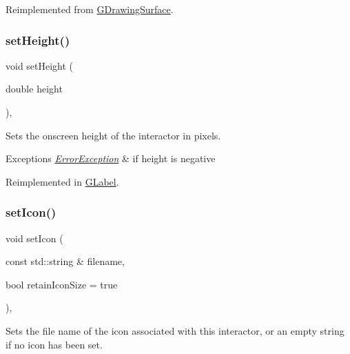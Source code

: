 Reimplemented from \mbox{\hyperlink{classGDrawingSurface_af59209aeadea6dfc6d97a2d8531f50e1}{G\+Drawing\+Surface}}.

\mbox{\label{classGInteractor_a9e280bfc4544dfaf8e4376c4e1a74357}} 
\subsubsection{\texorpdfstring{set\+Height()}{setHeight()}}
{\footnotesize\ttfamily void set\+Height (\begin{DoxyParamCaption}\item[{double}]{height }\end{DoxyParamCaption})\hspace{0.3cm}{\ttfamily [virtual]}, {\ttfamily [inherited]}}



Sets the onscreen height of the interactor in pixels. 


\begin{DoxyExceptions}{Exceptions}
{\em \mbox{\hyperlink{classErrorException}{Error\+Exception}}} & if height is negative \\
\hline
\end{DoxyExceptions}


Reimplemented in \mbox{\hyperlink{classGLabel_a8a1f6693796b536d1ace7ce0ff66afee}{G\+Label}}.

\mbox{\label{classGInteractor_a762e139aa311461c3984d3ad28293f64}} 
\subsubsection{\texorpdfstring{set\+Icon()}{setIcon()}}
{\footnotesize\ttfamily void set\+Icon (\begin{DoxyParamCaption}\item[{const std\+::string \&}]{filename,  }\item[{bool}]{retain\+Icon\+Size = {\ttfamily true} }\end{DoxyParamCaption})\hspace{0.3cm}{\ttfamily [virtual]}, {\ttfamily [inherited]}}



Sets the file name of the icon associated with this interactor, or an empty string if no icon has been set. 

